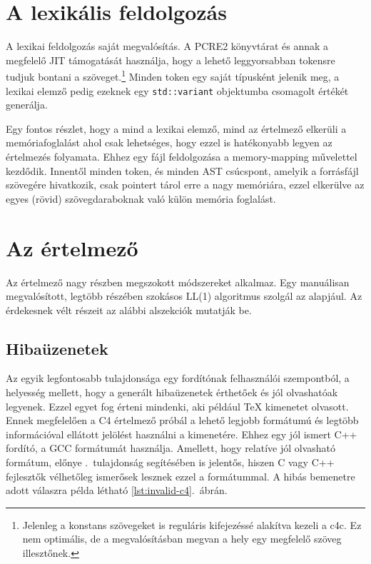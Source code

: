 \documentclass[magyar,12pt,a4paper,final,titlepage]{report}
\def\inlcode#1{{\color{inline-code-color}\tt #1}}
\begin{document}
    \section{A lexikális feldolgozás}

    A lexikai feldolgozás saját megvalósítás.
    A PCRE2 könyvtárat \cite{philip_hazel_pcre_2015} és annak a megfelelő \gls{JIT} támogatását használja, hogy a lehető leggyorsabban \glspl{token}re tudjuk bontani a szöveget.\footnote{Jelenleg a konstans szövegeket is reguláris kifejezéssé alakítva kezeli a c4c. Ez nem optimális, de a megvalósításban megvan a hely egy megfelelő szöveg illesztőnek.}
    Minden token egy saját típusként jelenik meg, a lexikai elemző pedig ezeknek egy \inlcode{std::variant} objektumba csomagolt értékét generálja.

    Egy fontos részlet, hogy a mind a lexikai elemző, mind az értelmező elkerüli a memóriafoglalást ahol csak lehetséges, hogy ezzel is hatékonyabb legyen az értelmezés folyamata.
    Ehhez egy fájl feldolgozása a \gls{memory-mapping} művelettel kezdődik.
    Innentől minden \gls{token}, és minden \gls{AST} csúcspont, amelyik a forrásfájl szövegére hivatkozik, csak pointert tárol erre a nagy memóriára, ezzel elkerülve az egyes (rövid) szövegdaraboknak való külön memória foglalást.

    \section{Az értelmező}

    Az értelmező nagy részben megszokott módszereket alkalmaz.
    Egy manuálisan megvalósított, legtöbb részében szokásos LL(1) algoritmus szolgál az alapjául.
    Az érdekesnek vélt részeit az alábbi alszekciók mutatják be.

    \subsection{Hibaüzenetek}

    Az egyik legfontosabb tulajdonsága egy fordítónak felhasználói szempontból, a helyesség mellett, hogy a generált hibaüzenetek érthetőek és jól olvashatóak legyenek.
    Ezzel egyet fog érteni mindenki, aki például \TeX{} kimenetet olvasott.
    Ennek megfelelően a C4 értelmező próbál a lehető legjobb formátumú és legtöbb információval ellátott jelölést használni a kimenetére.
    Ehhez egy jól ismert C++ fordító, a \gls{GCC} formátumát használja.
    Amellett, hogy relatíve jól olvasható formátum, előnye .~tulajdonság segítésében is jelentős, hiszen C vagy C++ fejlesztők vélhetőleg ismerősek lesznek ezzel a formátummal.
    A hibás bemenetre adott válaszra példa létható \ref{lst:invalid-c4}.~ábrán.
\end{document}
